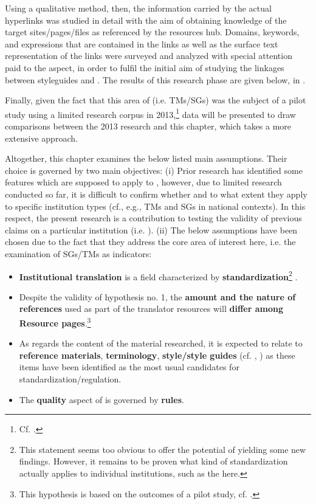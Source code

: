 \documentclass[output=paper]{langsci/langscibook}
\begin{document}
Using a qualitative method, then, the information carried by the actual hyperlinks was studied in detail with the aim of obtaining knowledge of the target sites/pages/files as referenced by the  resources hub. Domains, keywords, and expressions that are contained in the links as well as the surface text representation of the links were surveyed and analyzed with special attention paid to the  aspect, in order to fulfil the initial aim of studying the linkages between  styleguides and . The results of this research phase are given below, in .

\largerpage
Finally, given the fact that this area of  (i.e. TMs/SGs) was the subject of a pilot study using a limited research corpus in 2013,\footnote{Cf. \citealt{Svoboda2013}.} data will be presented to draw comparisons between the 2013 research and this chapter, which takes a more extensive approach.

Altogether, this chapter examines the below listed main assumptions. Their choice is governed by two main objectives: (i) Prior research has identified some features which are supposed to apply to , however, due to limited research conducted so far, it is difficult to confirm whether and to what extent they apply to specific institution types (cf., e.g., TMs and SGs in national contexts). In this respect, the present research is a contribution to testing the validity of previous claims on a particular institution (i.e. ). (ii) The below assumptions have been chosen due to the fact that they address the core area of interest here, i.e. the examination of SGs/TMs as  indicators:

\begin{itemize}
\item  \textbf{Institutional translation} is a field characterized by \textbf{standardization}\footnote{This statement seems too obvious to offer the potential of yielding some new findings. However, it remains to be proven what kind of standardization actually applies to individual institutions, such as the  here.} \citep[58]{Koskinen2011}.
\item 
Despite the validity of hypothesis no. 1, the \textbf{amount and the nature of references} used as part of the translator resources will \textbf{differ among Resource pages}.\footnote{This hypothesis is based on the outcomes of a pilot study, cf. \citet{Svoboda2013}.}
\item 
As regards the content of the material researched, it is expected to relate to \textbf{reference materials}, \textbf{terminology}, \textbf{style/style guides} (cf. \citealt{Koskinen2008}, \citealt{Schäffner2014}) as these items have been identified as the most usual candidates for standardization/regulation.
\item 
The \textbf{quality} aspect of  is governed by \textbf{rules}.
\end{itemize}
\end{document}
